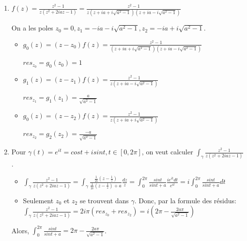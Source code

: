 \documentclass[10pt,a4paper,oneside]{article}
\newenvironment{solution}[1][Solution]{\begin{trivlist}
\item[\hskip \labelsep {\bfseries #1}]}{\end{trivlist}}
\begin{document}
\begin{solution}
\begin{enumerate}
\item
$f(z) = \frac{z^2 - 1}{z(z^2 + 2iaz - 1)} = \frac{z^2 - 1}{z(z + ia + i\sqrt{a^2-1})(z + ia - i\sqrt{a^2-1})}$

On a les poles $z_0 = 0, z_1 = -ia - i\sqrt{a^2 - 1}, z_2 = -ia + i\sqrt{a^2 - 1}$.

\begin{itemize}
\item
$g_0(z) = (z - z_0)f(z) = \frac{z^2 - 1}{(z + ia + i\sqrt{a^2-1})(z + ia - i\sqrt{a^2-1})}$

$res_{z_0} = g_0(z_0) = 1$

\item
$g_1(z) = (z - z_1)f(z) = \frac{z^2 - 1}{z(z + ia - i\sqrt{a^2-1})}$

$res_{z_1} = g_1(z_1) = \frac{a}{\sqrt{a^2 - 1}}$

\item
$g_0(z) = (z - z_2)f(z) = \frac{z^2 - 1}{z(z + ia + i\sqrt{a^2-1})}$

$res_{z_2} = g_2(z_2) = \frac{-a}{\sqrt{a^2 - 1}}$
\end{itemize}

\item
Pour $\gamma(t) = e^{it} = cost + isint, t \in [0,2\pi]$, on veut calculer $\int_{\gamma} \frac{z^2 - 1}{z(z^2 + 2iaz - 1)}$.

\begin{itemize}
\item
$\int_{\gamma} \frac{z^2 - 1}{z(z^2 + 2iaz - 1)} = \int_{\gamma} \frac{\frac{1}{2i}(z - \frac{1}{z})}{ \frac{1}{2i}(z - \frac{1}{z}) + a } \frac{dz}{z} = \int_{0}^{2\pi} \frac{sint}{sint + a} \frac{ie^{it}dt}{e^{it}}= i \int_{0}^{2\pi} \frac{sint}{sint + a} dt$

\item
Seulement $z_0$ et $z_2$ se trouvent dans $\gamma$. Donc, par la formule des résidus: $\int_{\gamma} \frac{z^2 - 1}{z(z^2 + 2iaz - 1)} = 2i\pi(res_{z_0} + res_{z_2}) = i (2\pi - \frac{2a\pi}{\sqrt{a^2-1}})$
\end{itemize}

Alors, $\int_{0}^{2\pi} \frac{sint}{sint + a} = 2\pi - \frac{2a\pi}{\sqrt{a^2-1}}$.

\end{enumerate}
\end{solution}
\end{document}

